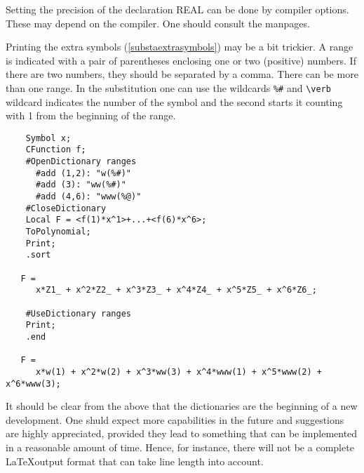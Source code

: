 Setting the precision of the declaration REAL can be done by 
compiler options. These may depend on the compiler. One should consult the 
manpages.

Printing the extra symbols (\ref{substaextrasymbols}) 
may be a bit trickier. A range is indicated with 
a pair of parentheses enclosing one or two (positive) numbers. If there are 
two numbers, they should be separated by a comma. There can be more than 
one range. In the substitution one can use the wildcards \verb:%#: and 
\verb:\verb:%
wildcard indicates the number of the symbol and the second starts it 
counting with 1 from the beginning of the range.
\begin{verbatim}
    Symbol x;
    CFunction f;
    #OpenDictionary ranges
      #add (1,2): "w(%#)"
      #add (3): "ww(%#)"
      #add (4,6): "www(%@)"
    #CloseDictionary
    Local F = <f(1)*x^1>+...+<f(6)*x^6>;
    ToPolynomial;
    Print;
    .sort

   F =
      x*Z1_ + x^2*Z2_ + x^3*Z3_ + x^4*Z4_ + x^5*Z5_ + x^6*Z6_;

    #UseDictionary ranges
    Print;
    .end

   F =
      x*w(1) + x^2*w(2) + x^3*ww(3) + x^4*www(1) + x^5*www(2) + x^6*www(3);
\end{verbatim}

It should be clear from the above that the dictionaries are the beginning 
of a new development. One shuld expect more capabilities in the future and 
suggestions are highly appreciated, provided they lead to something that 
can be implemented in a reasonable amount of time. Hence, for instance, 
there will not be a complete \LaTeX output format that can take line length 
into account.
